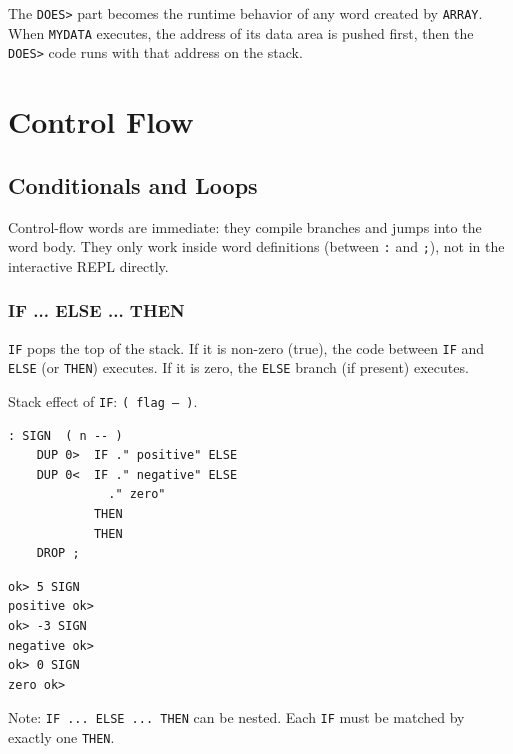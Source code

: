 The \texttt{DOES>} part becomes the runtime behavior of any word created by
\texttt{ARRAY}. When \texttt{MYDATA} executes, the address of its data area
is pushed first, then the \texttt{DOES>} code runs with that address on the
stack.

\part{Control Flow}

\chapter{Conditionals and Loops}
\label{chap:control}

Control-flow words are immediate: they compile branches and jumps into the
word body. They only work inside word definitions (between \texttt{:} and
\texttt{;}), not in the interactive REPL directly.

\section{IF ... ELSE ... THEN}
\label{sec:if-else-then}

\texttt{IF} pops the top of the stack. If it is non-zero (true), the code
between \texttt{IF} and \texttt{ELSE} (or \texttt{THEN}) executes. If it is
zero, the \texttt{ELSE} branch (if present) executes.

Stack effect of \texttt{IF}: \texttt{( flag -- )}.

\begin{lstlisting}[language=Forth]
: SIGN  ( n -- )
    DUP 0>  IF ." positive" ELSE
    DUP 0<  IF ." negative" ELSE
              ." zero"
            THEN
            THEN
    DROP ;
\end{lstlisting}

\begin{lstlisting}[language=Forth]
ok> 5 SIGN
positive ok>
ok> -3 SIGN
negative ok>
ok> 0 SIGN
zero ok>
\end{lstlisting}

Note: \texttt{IF ... ELSE ... THEN} can be nested. Each \texttt{IF} must be
matched by exactly one \texttt{THEN}.

